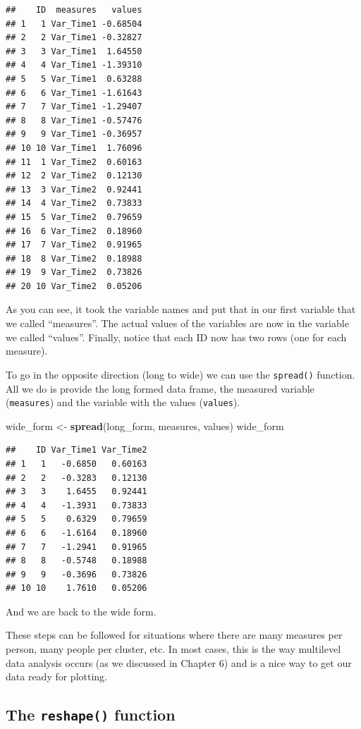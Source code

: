 \documentclass[]{tufte-book}
\newenvironment{Shaded}{}{}
\newcommand{\KeywordTok}[1]{\textcolor[rgb]{0.00,0.44,0.13}{\textbf{#1}}}
\newcommand{\StringTok}[1]{\textcolor[rgb]{0.25,0.44,0.63}{#1}}
\newcommand{\NormalTok}[1]{#1}
\theoremstyle{definition}
\theoremstyle{definition}
\theoremstyle{remark}
\begin{document}
\begin{verbatim}
##    ID  measures   values
## 1   1 Var_Time1 -0.68504
## 2   2 Var_Time1 -0.32827
## 3   3 Var_Time1  1.64550
## 4   4 Var_Time1 -1.39310
## 5   5 Var_Time1  0.63288
## 6   6 Var_Time1 -1.61643
## 7   7 Var_Time1 -1.29407
## 8   8 Var_Time1 -0.57476
## 9   9 Var_Time1 -0.36957
## 10 10 Var_Time1  1.76096
## 11  1 Var_Time2  0.60163
## 12  2 Var_Time2  0.12130
## 13  3 Var_Time2  0.92441
## 14  4 Var_Time2  0.73833
## 15  5 Var_Time2  0.79659
## 16  6 Var_Time2  0.18960
## 17  7 Var_Time2  0.91965
## 18  8 Var_Time2  0.18988
## 19  9 Var_Time2  0.73826
## 20 10 Var_Time2  0.05206
\end{verbatim}

As you can see, it took the variable names and put that in our first
variable that we called ``measures''. The actual values of the variables
are now in the variable we called ``values''. Finally, notice that each
ID now has two rows (one for each measure).

To go in the opposite direction (long to wide) we can use the
\texttt{spread()} function. All we do is provide the long formed data
frame, the measured variable (\texttt{measures}) and the variable with
the values (\texttt{values}).

\begin{Shaded}
\begin{Highlighting}[]
\NormalTok{wide_form <-}\StringTok{ }\KeywordTok{spread}\NormalTok{(long_form, measures, values)}
\NormalTok{wide_form}
\end{Highlighting}
\end{Shaded}

\begin{verbatim}
##    ID Var_Time1 Var_Time2
## 1   1   -0.6850   0.60163
## 2   2   -0.3283   0.12130
## 3   3    1.6455   0.92441
## 4   4   -1.3931   0.73833
## 5   5    0.6329   0.79659
## 6   6   -1.6164   0.18960
## 7   7   -1.2941   0.91965
## 8   8   -0.5748   0.18988
## 9   9   -0.3696   0.73826
## 10 10    1.7610   0.05206
\end{verbatim}

And we are back to the wide form.

These steps can be followed for situations where there are many measures
per person, many people per cluster, etc. In most cases, this is the way
multilevel data analysis occurs (as we discussed in Chapter 6) and is a
nice way to get our data ready for plotting.

\subsection*{\texorpdfstring{The \texttt{reshape()}
function}{The reshape() function}}\label{the-reshape-function}
\end{document}
